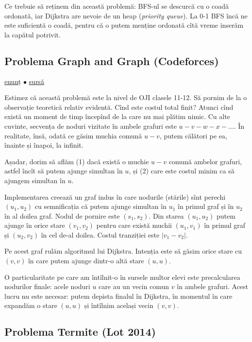 \documentclass[../main.tex]{subfiles}
\begin{document}
Ce trebuie să reținem din această problemă: BFS-ul se descurcă cu o coadă ordonată, iar Dijkstra are nevoie de un heap (\textit{priority queue}). La 0-1 BFS încă ne este suficientă o coadă, pentru că o putem menține ordonată cîtă vreme inserăm la capătul potrivit.

\subsection{Problema Graph and Graph (Codeforces)}
\label{problem:graph-and-graph}

\href{https://codeforces.com/contest/2059/problem/D}{enunț}
$\bullet$
\hyperref[code:graph-and-graph]{sursă}

Estimez că această problemă este la nivel de OJI clasele 11-12. Să pornim de la o observație teoretică relativ evidentă. Cînd este costul total finit? Atunci cînd există un moment de timp începînd de la care nu mai plătim nimic. Cu alte cuvinte, secvența de noduri vizitate în ambele grafuri este $u-v-w-x - \dots$. În realitate, însă, odată ce găsim muchia comună $u-v$, putem călători pe ea, înainte și înapoi, la infinit.

Așadar, dorim să aflăm (1) dacă există o muchie $u-v$ comună ambelor grafuri, astfel încît să putem ajunge simultan în $u$, și (2) care este costul minim ca să ajungem simultan în $u$.

Implementarea creează un graf indus în care nodurile (stările) sînt perechi $(u_1, u_2)$ cu semnificația că putem ajunge simultan în $u_1$ în primul graf și în $u_2$ în al doilea graf. Nodul de pornire este $(s_1, s_2)$. Din starea $(u_1, u_2)$ putem ajunge în orice stare $(v_1, v_2)$ pentru care există muchii $(u_1, v_1)$ în primul graf și $(u_2, v_2)$ în cel de-al doilea. Costul tranziției este $|v_1 - v_2|$.

Pe acest graf rulăm algoritmul lui Dijkstra. Intenția este să găsim orice stare cu $(v, v)$ în care putem ajunge dintr-o altă stare $(u, u)$.

O particularitate pe care am întîlnit-o în sursele multor elevi este precalcularea nodurilor finale: acele noduri $u$ care au un vecin comun $v$ în ambele grafuri. Acest lucru nu este necesar: putem depista finalul în Dijkstra, în momentul în care expandăm o stare $(u,u)$ și întîlnim același vecin $(v,v)$.


\subsection{Problema Termite (Lot 2014)}
\label{problem:termite}
\end{document}
